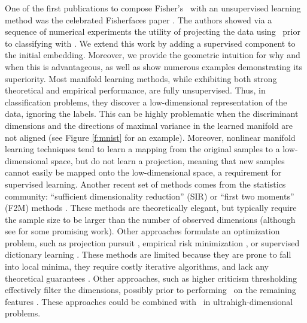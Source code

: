 \documentclass[10pt]{article}
\begin{document}
%
One of the first publications to compose Fisher's \Lda~with an unsupervised learning method was the celebrated Fisherfaces paper \cite{Belhumeur1997a}.  The authors showed via a sequence of numerical experiments the utility of projecting the data using \Pca~prior to classifying with \Lda.  We extend this work by adding a supervised component to the initial embedding.  Moreover, we provide the geometric intuition for why and when this is advantageous, as well as show numerous examples demonstrating its superiority.  %
%
Most manifold learning methods, while exhibiting both strong theoretical \cite{Eckart1936a,deSilva2003, Allard2012} and empirical performance, are fully unsupervised.  Thus, in classification problems, they discover a low-dimensional representation of the data, ignoring the labels.  This can be highly problematic when the discriminant dimensions and the directions of maximal variance in the learned manifold are not aligned (see Figure \ref{f:mnist} for an example). 
Moreover, nonlinear manifold learning techniques tend to learn a mapping from the original samples to a low-dimensional space, but do not learn a projection, meaning that new samples cannot easily be mapped onto the low-dimensional space, a requirement for supervised learning.  
%
Another recent  set of methods comes from the statistics community:   ``sufficient dimensionality reduction'' (SIR) or ``first two moments'' (F2M) methods  \cite{Li1991a, Tishby1999a, Globerson2003a, Cook2005a,Fukumizu2004a}.  These methods are theoretically elegant, but typically require the sample size to be larger than the number of observed dimensions (although see \cite{Cook2013} for some promising work).  Other approaches formulate an optimization problem, such as projection pursuit \cite{Huber1985a}, empirical risk minimization \cite{Belkin2006a}, or supervised dictionary learning \cite{Mairal2009}.  These methods are limited because they are prone to fall into local minima, they require costly iterative algorithms, and lack any theoretical guarantees \cite{Belkin2006a}.   
Other approaches, such as higher criticism thresholding \cite{Donoho2008a} effectively filter the dimensions, possibly prior to performing \Pca~on the remaining features \cite{Bair2006}. These approaches could be combined with \Lol~in ultrahigh-dimensional problems.  
\end{document}
